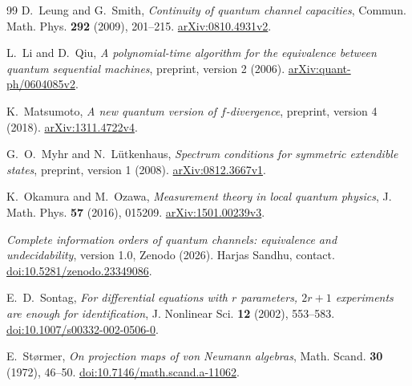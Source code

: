\documentclass[11pt,reqno]{amsart}
\theoremstyle{definition}
\theoremstyle{remark}
\numberwithin{equation}{section}
\begin{document}
\begin{thebibliography}{99}
D.~Leung and G.~Smith,
\emph{Continuity of quantum channel capacities},
Commun. Math. Phys. \textbf{292} (2009), 201--215.
\href{https://arxiv.org/abs/0810.4931v2}{arXiv:0810.4931v2}.

L.~Li and D.~Qiu,
\emph{A polynomial-time algorithm for the equivalence between quantum sequential machines},
preprint, version 2 (2006).
\href{https://arxiv.org/abs/quant-ph/0604085v2}{arXiv:quant-ph/0604085v2}.

K.~Matsumoto,
\emph{A new quantum version of $f$-divergence},
preprint, version 4 (2018).
\href{https://arxiv.org/abs/1311.4722v4}{arXiv:1311.4722v4}.

G.~O.~Myhr and N.~L\"utkenhaus,
\emph{Spectrum conditions for symmetric extendible states},
preprint, version 1 (2008).
\href{https://arxiv.org/abs/0812.3667v1}{arXiv:0812.3667v1}.

K.~Okamura and M.~Ozawa,
\emph{Measurement theory in local quantum physics},
J. Math. Phys. \textbf{57} (2016), 015209.
\href{https://arxiv.org/abs/1501.00239v3}{arXiv:1501.00239v3}.

\emph{Complete information orders of quantum channels: equivalence and undecidability},
version 1.0, Zenodo (2026). Harjas Sandhu, contact.
\href{https://doi.org/10.5281/zenodo.23349086}{doi:10.5281/zenodo.23349086}.

E.~D.~Sontag,
\emph{For differential equations with $r$ parameters, $2r+1$ experiments are enough for identification},
J. Nonlinear Sci. \textbf{12} (2002), 553--583.
\href{https://doi.org/10.1007/s00332-002-0506-0}{doi:10.1007/s00332-002-0506-0}.

E.~St\o rmer,
\emph{On projection maps of von Neumann algebras},
Math. Scand. \textbf{30} (1972), 46--50.
\href{https://doi.org/10.7146/math.scand.a-11062}{doi:10.7146/math.scand.a-11062}.

\end{thebibliography}
\end{document}
